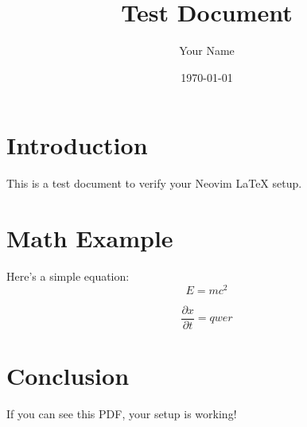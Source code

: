 \documentclass{article}
\title{Test Document}
\author{Your Name}
\date{\today}
\begin{document}
\maketitle

\section{Introduction}
This is a test document to verify your Neovim LaTeX setup.

\section{Math Example}
Here's a simple equation:
\begin{equation}
    E = mc^2
\end{equation}

\begin{equation*}
	\frac{\partial x}{\partial t} = qwer
\end{equation*}

\section{Conclusion}
If you can see this PDF, your setup is working!
\end{document}

